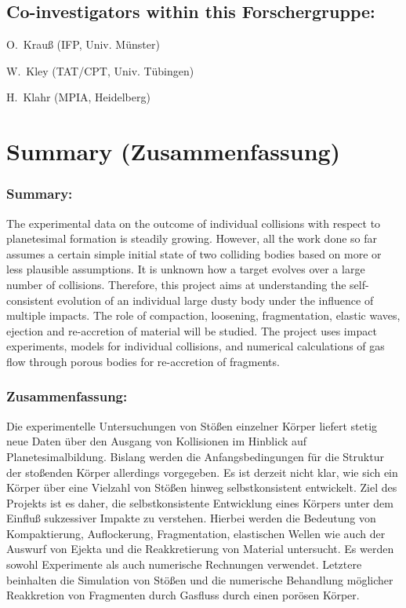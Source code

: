 \subsection{Co-investigators within this Forschergruppe:}
\begin{coilist}
\item O.~Krau{\ss} (IFP, Univ. M\"unster)
\item W.~Kley (TAT/CPT, Univ. T\"ubingen)
\item H.~Klahr (MPIA, Heidelberg)
\end{coilist}


\newpage

\section{Summary (Zusammenfassung)}
\subsubsection{Summary:}
The experimental data on the outcome of individual collisions with respect to planetesimal formation
is steadily growing. However, all the
work done so far assumes a certain simple initial state of two colliding bodies based on
more or less plausible assumptions. It is unknown how a target evolves over a
large number of collisions. Therefore, this project aims at understanding the self-consistent evolution
of an individual large dusty body under the influence of multiple impacts. The
role of compaction, loosening, fragmentation, elastic waves, ejection and
re-accretion of material will be studied. The project uses impact
experiments, models for individual collisions, and numerical calculations of
gas flow through porous bodies for re-accretion of fragments.

\subsubsection{Zusammenfassung:}
Die experimentelle Untersuchungen von St\"o{\ss}en einzelner K\"orper liefert stetig neue Daten \"uber den Ausgang 
von Kollisionen im Hinblick auf Planetesimalbildung. Bislang werden die Anfangsbedingungen
f\"ur die Struktur der sto{\ss}enden K\"orper allerdings
vor\-ge\-geben. Es ist derzeit nicht klar, wie sich ein K\"orper \"uber eine Vielzahl von St\"o{\ss}en hinweg
selbstkonsistent entwickelt. Ziel des Projekts ist es daher, die selbstkonsistente Entwicklung eines
K\"orpers unter
dem Einflu{\ss} sukzessiver Impakte zu verstehen. Hierbei werden die Bedeutung von Kompaktierung,
Auflockerung, Fragmentation, elastischen Wellen wie auch der Auswurf von Ejekta und die
Reakkretierung von Material untersucht. Es werden sowohl Experimente als auch
numerische Rechnungen verwendet. Letztere beinhalten die Simulation von St\"o{\ss}en und die numerische
Behandlung m\"oglicher
Reakkretion von Fragmenten durch Gasfluss durch einen por\"osen K\"orper.

